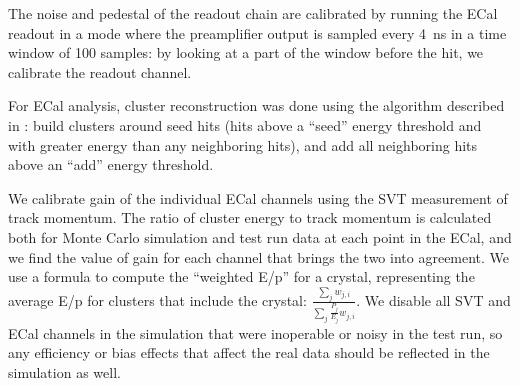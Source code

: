 \vspace{1cm}{\bf ECal Calibration}

The noise and pedestal of the readout chain are calibrated by running the ECal readout in a mode where the preamplifier output is sampled every 4~ns in a time window of 100 samples: by looking at a part of the window before the hit, we calibrate the readout channel.

For ECal analysis, cluster reconstruction was done using the algorithm described in \cite{HPS_PROP}: build clusters around seed hits (hits above a ``seed'' energy threshold and with greater energy than any neighboring hits), and add all neighboring hits above an ``add'' energy threshold.

We calibrate gain of the individual ECal channels using the SVT measurement of track momentum. 
The ratio of cluster energy to track momentum is calculated both for Monte Carlo simulation and test run data at each point in the ECal, and we find the value of gain for each channel that brings the two into agreement.
We use a formula to compute the ``weighted E/p'' for a crystal, representing the average E/p for clusters that include the crystal: $\frac{\sum_j w_{j,i}}{\sum_j\frac{P_j}{E_j}w_{j,i}}$.
We disable all SVT and ECal channels in the simulation that were inoperable or noisy in the test run, so any efficiency or bias effects that affect the real data should be reflected in the simulation as well.

